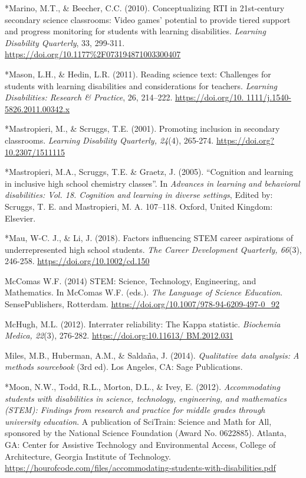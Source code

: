 \documentclass[11pt]{sig-alternate}
\begin{document}
\begin{large}
*Marino, M.T., \& Beecher, C.C. (2010). Conceptualizing RTI in 21st-century secondary science 
classrooms: Video games’ potential to provide tiered support and progress monitoring for students with learning disabilities.\textit{ Learning Disability Quarterly}, 33, 299-311. \url{https://doi.org/10.1177%2F073194871003300407}

*Mason, L.H., \& Hedin, L.R. (2011). Reading science text: Challenges for students with learning disabilities and considerations for teachers. \textit{Learning Disabilities: Research \& Practice}, 26, 214–222. \url{https://doi.org/10. 1111/j.1540-5826.2011.00342.x}

*Mastropieri, M., \& Scruggs, T.E. (2001). Promoting inclusion in secondary classrooms. \textit{Learning Disability Quarterly, 24}(4), 265-274. \url{https://doi.org?10.2307/1511115}

*Mastropieri, M.A., Scruggs, T.E. \& Graetz, J. (2005). “Cognition and learning in inclusive high 
school chemistry classes”. In\textit{ Advances in learning and behavioral disabilities: Vol. 18. 
Cognition and learning in diverse settings}, Edited by: Scruggs, T. E. and Mastropieri, M. 
A. 107–118. Oxford, United Kingdom: Elsevier.

*Mau, W-C. J., \& Li, J. (2018). Factors influencing STEM career aspirations of underrepresented high school students.\textit{ The Career Development Quarterly, 66}(3), 246-258. \url{https://doi.org/10.1002/cd.150}

McComas W.F. (2014) STEM: Science, Technology, Engineering, and Mathematics. In McComas W.F. (eds.). \textit{The Language of Science Education}. SensePublishers, Rotterdam. \url{https://doi.org/10.1007/978-94-6209-497-0_92}

McHugh, M.L. (2012). Interrater reliability: The Kappa statistic. \textit{Biochemia Medica, 22}(3), 276-282. \url{https://doi.org:10.11613/ BM.2012.031}

Miles, M.B., Huberman, A.M., \& Saldaña, J. (2014).\textit{ Qualitative data analysis: A methods sourcebook} (3rd ed). Los Angeles, CA: Sage Publications. 

*Moon, N.W., Todd, R.L., Morton, D.L., \& Ivey, E. (2012). \textit{Accommodating students with disabilities in science, technology, engineering, and mathematics (STEM): Findings from research and practice for middle grades through university education}. A publication of SciTrain: Science and Math for All, sponsored by the National Science Foundation (Award No. 0622885). Atlanta, GA: Center for Assistive Technology and Environmental Access, College of Architecture, Georgia Institute of Technology. \url{https://hourofcode.com/files/accommodating-students-with-disabilities.pdf}


\end{large}
\end{document}
